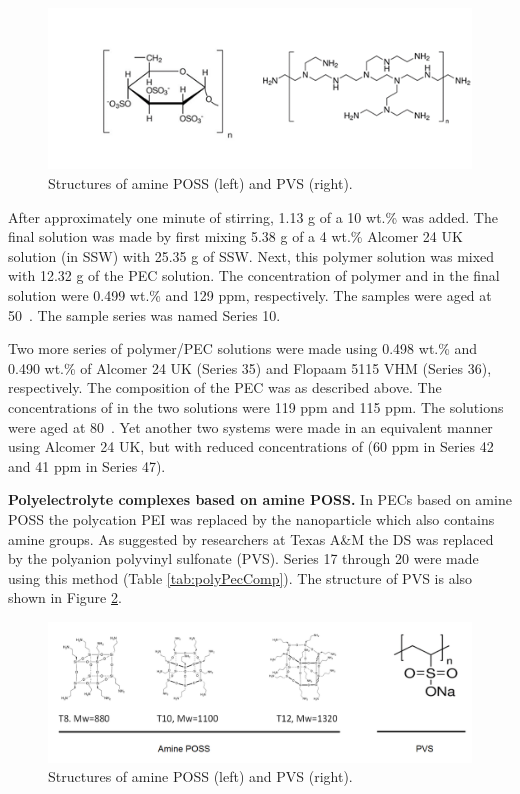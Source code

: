 \documentclass[journal = enfuem, manuscript =  article]{achemso}
\begin{document}
\begin{figure}[h]
    \centering
    \includegraphics[width=\textwidth]{fig/pei.png}
    \caption{Structures of amine POSS (left) and PVS (right).}
    \label{fig:pei}
\end{figure}    

 
After approximately one minute of stirring, 1.13 g of a 10 wt.\%  was added. The final solution was made by first mixing 5.38 g of a 4 wt.\% Alcomer 24 UK solution (in SSW) with 25.35 g of SSW. Next, this polymer solution was mixed with 12.32 g of the PEC solution. The concentration of polymer and  in the final solution were 0.499 wt.\% and 129 ppm, respectively. The samples were aged at 50~\celsius. The sample series was named Series 10.

Two more series of polymer/PEC solutions were made using 0.498 wt.\% and 0.490 wt.\% of Alcomer 24 UK (Series 35) and Flopaam 5115 VHM (Series 36), respectively. The composition of the PEC was as described above. The concentrations of  in the two solutions were 119 ppm and 115 ppm. The solutions were aged at 80~\celsius. Yet another two systems were made in an equivalent manner using Alcomer 24 UK, but with reduced concentrations of  (60 ppm in Series 42 and 41 ppm in Series 47).

\textbf{Polyelectrolyte complexes based on amine POSS.}
In PECs based on amine POSS the polycation PEI was replaced by the nanoparticle which also contains amine groups. As suggested by researchers at Texas A\&M the DS was replaced by the polyanion polyvinyl sulfonate (PVS). Series 17 through 20 were made using this method (Table \ref{tab:polyPecComp}). The structure of PVS is also shown in Figure \ref{fig:pvs}.

\begin{figure}[h]
    \centering
    \includegraphics[width=\textwidth]{fig/pvs.png}
    \caption{Structures of amine POSS (left) and PVS (right).}
    \label{fig:pvs}
\end{figure}
\end{document}
